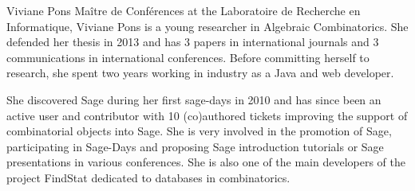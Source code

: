\begin{participant}[PM=6,salary=4200]{Viviane Pons}
  Maître de Conférences at the Laboratoire de Recherche en Informatique, Viviane Pons is a
  young researcher in Algebraic Combinatorics. She defended her thesis in 2013 and has 3
  papers in international journals and 3 communications in international
  conferences. Before committing herself to research, she spent two years working in
  industry as a Java and web developer.

  She discovered Sage during her first sage-days in 2010 and has since been an active user
  and contributor with 10 (co)authored tickets improving the support of combinatorial
  objects into Sage. She is very involved in the promotion of Sage, participating in
  Sage-Days and proposing Sage introduction tutorials or Sage presentations in various
  conferences.  She is also one of the main developers of the project FindStat dedicated
  to databases in combinatorics.
\end{participant}
